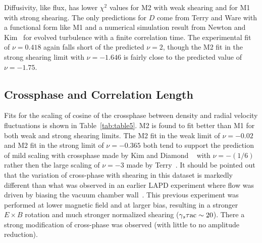 \documentclass[aip,pop,amsmath,amssymb,preprint,superscriptaddress]{revtex4-1} %
\begin{document}
Diffusivity, like flux, has lower $\chi^{2}$ values for M2 with weak shearing and for M1 with strong shearing. The only predictions for $D$ come from Terry and Ware with a functional form like M1 and a numerical simulation result from Newton and Kim~\cite{newton11} for evolved turbulence with a finite correlation time. The experimental fit of $\nu = 0.418$ again falls short of the predicted $\nu = 2$, though the M2 fit in the strong shearing limit with $\nu = -1.646$ is fairly close to the predicted value of $\nu = -1.75$.


\subsection{Crossphase and Correlation Length}

Fits for the scaling of cosine of the crossphase between density and radial velocity fluctuations is shown in Table~\ref{tab:table5}. M2 is found to fit better than M1 for both weak and strong shearing limits. The M2 fit in the weak limit of $\nu = -0.02$ and M2 fit in the strong limit of $\nu = -0.365$ both tend to support the prediction of mild scaling with crossphase made by Kim and Diamond ~\cite{kim03,kim04} with $\nu = -(1/6)$ rather then the large scaling of $\nu = -3$ made by Terry~\cite{terry01}. It should be pointed out that the variation of cross-phase with shearing in this dataset is markedly different than what was observed in an earlier LAPD experiment where flow was driven by biasing the vacuum chamber wall~\cite{carter09}.  This previous experiment was performed at lower magnetic field and at larger bias, resulting in a stronger $E\times B$ rotation and much stronger normalized shearing ($\gamma_s\tau{\rm ac} \sim 20$).  There a strong modification of cross-phase was observed (with little to no amplitude reduction).  
\end{document}
